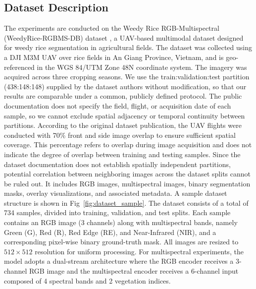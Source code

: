 \documentclass[pdflatex,sn-mathphys-num]{sn-jnl}
\begin{document}
\subsection{Dataset Description}
The experiments are conducted on the Weedy Rice RGB-Multispectral (WeedyRice-RGBMS-DB) dataset \cite{nguyen2025dataset}, a UAV-based multimodal dataset designed for weedy rice segmentation in agricultural fields. The dataset was collected using a DJI M3M UAV over rice fields in An Giang Province, Vietnam, and is geo-referenced in the WGS 84/UTM Zone 48N coordinate system. The imagery was acquired across three cropping seasons. We use the train:validation:test partition (438:148:148) supplied by the dataset authors without modification, so that our results are comparable under a common, publicly defined protocol. The public documentation does not specify the field, flight, or acquisition date of each sample, so we cannot exclude spatial adjacency or temporal continuity between partitions. According to the original dataset publication, the UAV flights were conducted with 70\% front and side image overlap to ensure sufficient spatial coverage. This percentage refers to overlap during image acquisition and does not indicate the degree of overlap between training and testing samples. Since the dataset documentation does not establish spatially independent partitions, potential correlation between neighboring images across the dataset splits cannot be ruled out. It includes RGB images, multispectral images, binary segmentation masks, overlay visualizations, and associated metadata. A sample dataset structure is shown in Fig~\ref{fig:dataset_sample}. The dataset consists of a total of 734 samples, divided into training, validation, and test splits. Each sample contains an RGB image (3 channels) along with multispectral bands, namely Green (G), Red (R), Red Edge (RE), and Near-Infrared (NIR), and a corresponding pixel-wise binary ground-truth mask. All images are resized to $512 \times 512$ resolution for uniform processing. For multispectral experiments, the model adopts a dual-stream architecture where the RGB encoder receives a 3-channel RGB image and the multispectral encoder receives a 6-channel input composed of 4 spectral bands and 2 vegetation indices.
\end{document}
